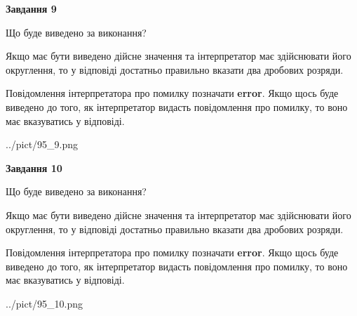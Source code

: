\documentclass[12pt, ukrainian]{article}
\begin{document}
{\begin {Large}
{\begin {center}\textbf{Завдання 9}\end {center}}\par
Що буде виведено за виконання? \par

Якщо має бути виведено дійсне значення та інтерпретатор має здійснювати його округлення, 
то у відповіді достатньо правильно вказати два дробових розряди.

Повідомлення інтерпретатора про помилку позначати \textbf{error}.
Якщо щось буде виведено до того, як інтерпретатор видасть повідомлення про помилку, 
то воно має вказуватись у відповіді. \par

\begin{center}
	{../pict/95_9.png}
\end{center}
\newpage

{\begin {center}\textbf{Завдання 10}\end {center}}\par
Що буде виведено за виконання? \par

Якщо має бути виведено дійсне значення та інтерпретатор має здійснювати його округлення, 
то у відповіді достатньо правильно вказати два дробових розряди.

Повідомлення інтерпретатора про помилку позначати \textbf{error}.
Якщо щось буде виведено до того, як інтерпретатор видасть повідомлення про помилку, 
то воно має вказуватись у відповіді. \par

\begin{center}
	{../pict/95_10.png}
\end{center}
\newpage

\end {Large}}
\end{document}
